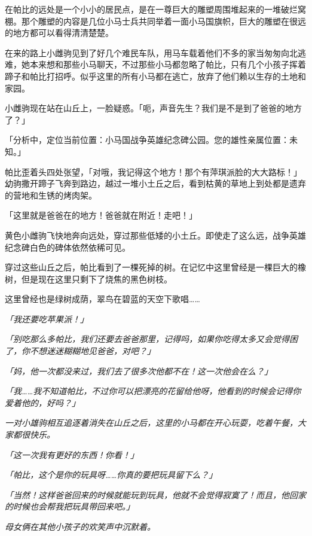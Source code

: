 \horizonline


在帕比的远处是一个小小的居民点，是在一尊巨大的雕塑周围堆起来的一堆破烂窝棚。那个雕塑的内容是几位小马士兵共同举着一面小马国旗帜，巨大的雕塑在很远的地方都可以看得清清楚楚。

在来的路上小雌驹见到了好几个难民车队，用马车载着他们不多的家当匆匆向北逃难，她本来想和那些小马聊天，不过那些小马都忽略了帕比，只有几个小孩子挥着蹄子和帕比打招呼。似乎这里的所有小马都在逃亡，放弃了他们赖以生存的土地和家园。

小雌驹现在站在山丘上，一脸疑惑。「呃，声音先生？我们是不是到了爸爸的地方了？」

「{\mt 分析中，定位当前位置：小马国战争英雄纪念碑公园。您的雄性亲属位置：未知。}」

帕比歪着头四处张望，「对哦，我记得这个地方！那个有萍琪派脸的大大路标！」幼驹撒开蹄子飞奔到路边，越过一堆小土丘之后，看到枯黄的草地上到处都是遗弃的营地和生锈的烤肉架。

「这里就是爸爸在的地方！爸爸就在附近！走吧！」

黄色小雌驹飞快地奔向远处，穿过那些低矮的小土丘。即使走了这么远，战争英雄纪念碑白色的碑体依然依稀可见。

穿过这些山丘之后，帕比看到了一棵死掉的树。在记忆中这里曾经是一棵巨大的橡树，但是现在这里只剩下了烧焦的黑色树枝。

这里曾经也是绿树成荫，翠鸟在碧蓝的天空下歌唱……

\emph{「我还要吃苹果派！」}

\emph{「别吃那么多帕比，我们还要去爸爸那里，记得吗，如果你吃得太多又会觉得困了，你不想迷迷糊糊地见爸爸，对吧？」}

\emph{「妈，他一次都没来过，我们去了很多次他都不在！这一次他会在么？」}

\emph{「我……我不知道帕比，不过你可以把漂亮的花留给他呀，他看到的时候会记得你爱着他的，好吗？」}

\emph{一对小雄驹相互追逐着消失在山丘之后，这里的小马都在开心玩耍，吃着午餐，大家都很快乐。}

\emph{「这一次我有更好的东西！你看！」}

\emph{「帕比，这个是你的玩具呀……你真的要把玩具留下么？」}

\emph{「当然！这样爸爸回来的时候就能玩到玩具，他就不会觉得寂寞了！而且，他回家的时候也会帮我把玩具带回来吧。」}

\emph{母女俩在其他小孩子的欢笑声中沉默着。}


